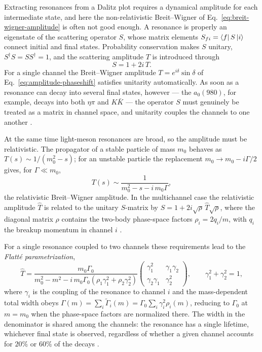Extracting resonances from a Dalitz plot requires a dynamical amplitude for each
intermediate state, and here the non-relativistic Breit--Wigner of
Eq.~\eqref{eq:breit-wigner-amplitude} is often not good enough. A resonance is
properly an eigenstate of the scattering operator $S$, whose matrix elements
$S_{fi}=\bra{f}S\ket{i}$ connect initial and final states. Probability
conservation makes $S$ unitary, $S^\dagger S = S S^\dagger = 1$, and the
scattering amplitude $T$ is introduced through
\begin{equation}
  S = 1 + 2i\,T .
  \label{eq:smatrix}
\end{equation}
For a single channel the Breit--Wigner amplitude
$T = e^{i\delta}\sin\delta$ of Eq.~\eqref{eq:amplitude-phaseshift} satisfies
unitarity automatically. As soon as a resonance can decay into several final
states, however --- the $a_0(980)$, for example, decays into both $\eta\pi$ and
$K\bar K$ --- the operator $S$ must genuinely be treated as a matrix in channel
space, and unitarity couples the channels to one another
\cite[Ch.~12]{Amsler2018}.

At the same time light-meson resonances are broad, so the amplitude must be
relativistic. The propagator of a stable particle of mass $m_0$ behaves as
$T(s)\sim 1/(m_0^2-s)$; for an unstable particle the replacement
$m_0\to m_0 - i\Gamma/2$ gives, for $\Gamma\ll m_0$,
\begin{equation}
  T(s) \sim \frac{1}{m_0^2 - s - i\,m_0\Gamma},
  \label{eq:rel_bw}
\end{equation}
the relativistic Breit--Wigner amplitude. In the multichannel case the relativistic
amplitude $\hat T$ is related to the unitary $S$-matrix by
$S = 1 + 2i\sqrt{\rho}\,\hat T\sqrt{\rho}$, where the diagonal matrix
$\rho$ contains the two-body phase-space factors $\rho_i = 2q_i/m$, with $q_i$ the
breakup momentum in channel $i$ \cite[Ch.~12]{Amsler2018}.

For a single resonance coupled to two channels these requirements lead to the
\emph{Flatt\'e parametrization},
\begin{equation}
  \hat T =
  \frac{m_0\Gamma_0}
       {m_0^2 - m^2 - i\,m_0\Gamma_0\!\left(\rho_1\gamma_1^2 + \rho_2\gamma_2^2\right)}
  \begin{pmatrix} \gamma_1^2 & \gamma_1\gamma_2 \\[2pt]
                  \gamma_2\gamma_1 & \gamma_2^2 \end{pmatrix},
  \qquad \gamma_1^2 + \gamma_2^2 = 1,
  \label{eq:flatte}
\end{equation}
where $\gamma_i$ is the coupling of the resonance to channel $i$ and the
mass-dependent total width obeys
$\Gamma(m) = \sum_i\tilde\Gamma_i(m) = \Gamma_0\sum_i\gamma_i^2\rho_i(m)$, reducing to
$\Gamma_0$ at $m = m_0$ when the phase-space factors are normalized there. The
width in the denominator is shared among the channels: the resonance has a single
lifetime, whichever final state is observed, regardless of whether a given channel
accounts for $20\%$ or $60\%$ of the decays \cite[Ch.~12]{Amsler2018}.

